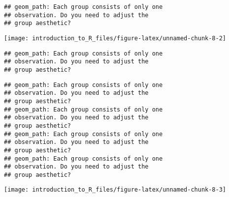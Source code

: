 \documentclass[]{tufte-handout}
\newenvironment{Shaded}{}{}
\newcommand{\CommentTok}[1]{\textcolor[rgb]{0.38,0.63,0.69}{\textit{#1}}}
\newcommand{\DataTypeTok}[1]{\textcolor[rgb]{0.56,0.13,0.00}{#1}}
\newcommand{\KeywordTok}[1]{\textcolor[rgb]{0.00,0.44,0.13}{\textbf{#1}}}
\newcommand{\NormalTok}[1]{#1}
\newcommand{\OperatorTok}[1]{\textcolor[rgb]{0.40,0.40,0.40}{#1}}
\newcommand{\StringTok}[1]{\textcolor[rgb]{0.25,0.44,0.63}{#1}}
\begin{document}
\begin{verbatim}
## geom_path: Each group consists of only one
## observation. Do you need to adjust the
## group aesthetic?
\end{verbatim}

\texttt{[image: introduction\_to\_R\_files/figure-latex/unnamed-chunk-8-2]}

\begin{Shaded}
\end{Shaded}

\begin{verbatim}
## geom_path: Each group consists of only one
## observation. Do you need to adjust the
## group aesthetic?
\end{verbatim}

\begin{verbatim}
## geom_path: Each group consists of only one
## observation. Do you need to adjust the
## group aesthetic?
## geom_path: Each group consists of only one
## observation. Do you need to adjust the
## group aesthetic?
## geom_path: Each group consists of only one
## observation. Do you need to adjust the
## group aesthetic?
## geom_path: Each group consists of only one
## observation. Do you need to adjust the
## group aesthetic?
\end{verbatim}

\texttt{[image: introduction\_to\_R\_files/figure-latex/unnamed-chunk-8-3]}
\end{document}

